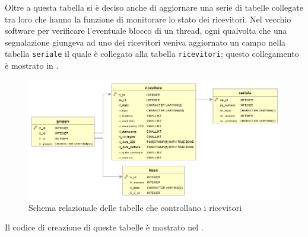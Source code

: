 Oltre a questa tabella si è deciso anche di aggiornare una serie di tabelle collegate tra loro che hanno la funzione di monitorare lo stato dei ricevitori. Nel vecchio software per verificare l'eventuale blocco di un thread, ogni qualvolta che una segnalazione giungeva ad uno dei ricevitori veniva aggiornato un campo nella tabella \texttt{seriale} il quale è collegato alla tabella \texttt{ricevitori}; questo collegamento è mostrato in .
\begin{figure}
	\centering
	\includegraphics[width=0.8\linewidth]{pictures/erricevitori.png}
	\caption{Schema relazionale delle tabelle che controllano i ricevitori}\label{fig:erricevitori}
\end{figure}
Il codice di creazione di queste tabelle è mostrato nel .

